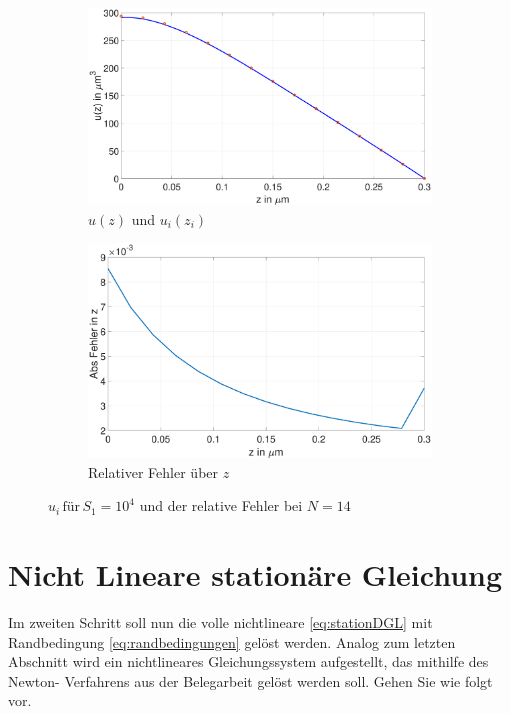 \begin{figure}[h]
	\begin{subfigure}[b]{0.5\textwidth}
		\includegraphics[width=\textwidth]{figures/station_gl_2_1/S3}
		\caption{$u(z)$ und $u_{i}(z_i)$}
	\end{subfigure}
	\hfill
	\begin{subfigure}[b]{0.5\textwidth}
		\includegraphics[width=1\linewidth]{figures/station_gl_2_1/S3_fehler}
		\caption{Relativer Fehler über $z$}
	\end{subfigure}
	\caption{$u_i \,\text{für} \, S_1=10^4$ und der relative Fehler bei $N=14$ }
\end{figure}




\section{Nicht Lineare stationäre Gleichung}\label{cap:nichtlinear}
\begin{mybox}
	Im zweiten Schritt soll nun die volle nichtlineare \cref{eq:stationDGL}
	mit Randbedingung \cref{eq:randbedingungen} gelöst werden. Analog
	zum letzten Abschnitt wird ein nichtlineares Gleichungssystem
	aufgestellt, das mithilfe des Newton-
	Verfahrens aus der Belegarbeit gelöst werden soll. Gehen Sie wie folgt
	vor.\cite{Prof.Dr.AndreasZeiser.April2021}
\end{mybox}

